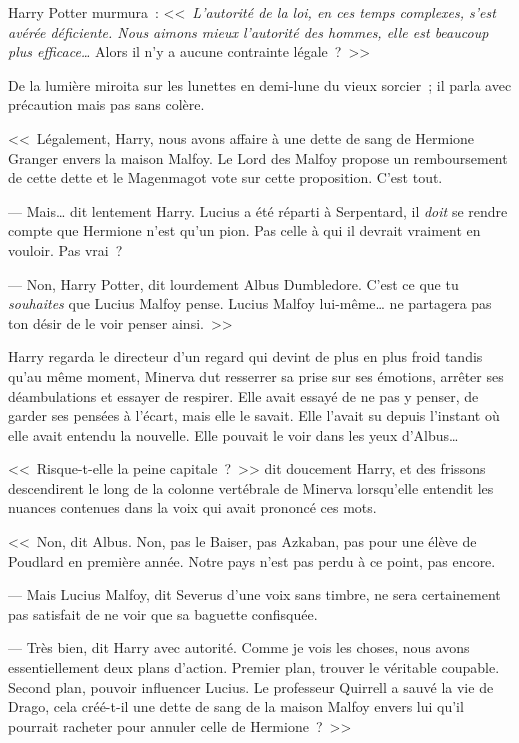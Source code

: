 Harry Potter murmura~: <<~\emph{L'autorité de la loi, en ces temps complexes, s'est avérée déficiente. Nous aimons mieux l'autorité des hommes, elle est beaucoup plus efficace…} Alors il n'y a aucune contrainte légale~?~>>

De la lumière miroita sur les lunettes en demi-lune du vieux sorcier~; il parla avec précaution mais pas sans colère.

<<~Légalement, Harry, nous avons affaire à une dette de sang de Hermione Granger envers la maison Malfoy. Le Lord des Malfoy propose un remboursement de cette dette et le Magenmagot vote sur cette proposition. C'est tout.

--- Mais… dit lentement Harry. Lucius a été réparti à Serpentard, il \emph{doit} se rendre compte que Hermione n'est qu'un pion. Pas celle à qui il devrait vraiment en vouloir. Pas vrai~?

--- Non, Harry Potter, dit lourdement Albus Dumbledore. C'est ce que tu \emph{souhaites} que Lucius Malfoy pense. Lucius Malfoy lui-même… ne partagera pas ton désir de le voir penser ainsi.~>>

Harry regarda le directeur d'un regard qui devint de plus en plus froid tandis qu'au même moment, Minerva dut resserrer sa prise sur ses émotions, arrêter ses déambulations et essayer de respirer. Elle avait essayé de ne pas y penser, de garder ses pensées à l'écart, mais elle le savait. Elle l'avait su depuis l'instant où elle avait entendu la nouvelle. Elle pouvait le voir dans les yeux d'Albus…

<<~Risque-t-elle la peine capitale~?~>> dit doucement Harry, et des frissons descendirent le long de la colonne vertébrale de Minerva lorsqu'elle entendit les nuances contenues dans la voix qui avait prononcé ces mots.

<<~Non, dit Albus. Non, pas le Baiser, pas Azkaban, pas pour une élève de Poudlard en première année. Notre pays n'est pas perdu à ce point, pas encore.

--- Mais Lucius Malfoy, dit Severus d'une voix sans timbre, ne sera certainement pas satisfait de ne voir que sa baguette confisquée.

--- Très bien, dit Harry avec autorité. Comme je vois les choses, nous avons essentiellement deux plans d'action. Premier plan, trouver le véritable coupable. Second plan, pouvoir influencer Lucius. Le professeur Quirrell a sauvé la vie de Drago, cela créé-t-il une dette de sang de la maison Malfoy envers lui qu'il pourrait racheter pour annuler celle de Hermione~?~>>

